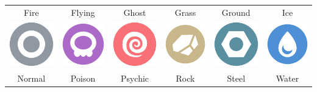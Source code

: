 \begin{table}
\begin{tabular}{c c c c c c}
  Fire & Flying & Ghost & Grass & Ground & Ice \\
  \includegraphics[scale=.25]{images/normal.png} &
    \includegraphics[scale=.25]{images/poison.png} &
    \includegraphics[scale=.25]{images/psychic.png} &
    \includegraphics[scale=.25]{images/rock.png} &
    \includegraphics[scale=.25]{images/steel.png} &
    \includegraphics[scale=.25]{images/water.png} \\
  Normal & Poison & Psychic & Rock & Steel & Water \\
\end{tabular}
\end{table}

